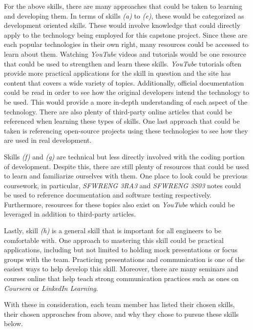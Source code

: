 \documentclass[12pt]{article}
\begin{document}
\begin{enumerate}
  For the above skills, there are many approaches that could be taken to learning
  and developing them. In terms of skills \textit{(a)} to \textit{(e)}, these would be categorized as
  development oriented skills. These would involve knowledge that could directly apply to
  the technology being employed for this capstone project. Since these are each popular
  technologies in their own right, many resources could be accessed to learn about them. Watching
  \textit{YouTube} videos and tutorials would be one resource that could be used to strengthen
  and learn these skills. \textit{YouTube} tutorials often provide more practical applications
  for the skill in question and the site has content that covers a wide variety of topics.
  Additionally, official documentation could be read in order to see how the original developers intend
  the technology to be used. This would provide a more in-depth understanding of each aspect of the
  technology. There are also plenty of third-party online articles that could be referenced when
  learning these types of skills. One last approach that could be taken is referencing open-source
  projects using these technologies to see how they are used in real development.\par

  Skills \textit{(f)} and \textit{(g)} are technical but less directly involved with the coding portion
  of development. Despite this, there are still plenty of resources that could be used to learn and
  familiarize ourselves with them. One place to look could be previous coursework, in particular,
  \textit{SFWRENG 3RA3} and \textit{SFWRENG 3S03} notes could be used to reference documentation and
  software testing respectively. Furthermore, resources for these topics also exist on \textit{YouTube}
  which could be leveraged in addition to third-party articles.\par

  Lastly, skill \textit{(h)} is a general skill that is important for all engineers to be comfortable
  with. One approach to mastering this skill could be practical applications, including but not limited to holding
  mock presentations or focus groups with the team. Practicing presentations and communication is one of the
  easiest ways to help develop this skill. Moreover, there are many seminars and courses online that help
  teach strong communication practices such as ones on \textit{Coursera} or \textit{LinkedIn Learning}.\par

  With these in consideration, each team member has listed their chosen skills, their chosen approaches from above,
  and why they chose to pursue these skills below.


\end{enumerate}
\end{document}

